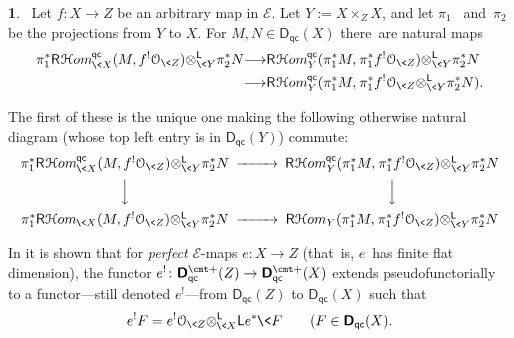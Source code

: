 \documentclass{compositio}
\theoremstyle{plain}
\theoremstyle{definition}
\newtheorem{cosa}[thm]{}
\theoremstyle{remark}
\numberwithin{equation}{thm}
\begin{document}
\begin{cosa}
\
Let $f\colon X\to Z$ be an arbitrary map in ${\mathscr{E}}$. Let $Y{\!:=} X\times_ZX$, and let $\pi_1$~
and~$\pi_2$ be the projections from $Y$ to $X$. 
For  $M, N\in{{\boldsymbol{\mathsf{D}}}_{\mathsf{qc}}}(X)$ there~are natural maps{\vspace{2pt}}
\begin{equation}
\label{setup}
\begin{aligned}
\pi_1^*{{\mathsf R}{\mkern1mu}{{\mathcal H} om}_{{{\mkern-1mu}\<X}}^{{\mkern-1mu}{\mathsf{qc}}}}(M,f^!{\mathcal O_{\<Z}}){\otimes^{\mathsf L}_{{\<Y}}}\pi_2^*N
&{\longrightarrow} {{\mathsf R}{\mkern1mu}{{\mathcal H} om}_{{Y}}^{{\mkern-1mu}{\mathsf{qc}}}}(\pi_1^*M,{\mkern1mu}\pi_1^*f^!{\mathcal O_{\<Z}}){\otimes^{\mathsf L}_{{\<Y}}}\pi_2^*N\\
&{\longrightarrow} {{\mathsf R}{\mkern1mu}{{\mathcal H} om}_{{Y}}^{{\mkern-1mu}{\mathsf{qc}}}}(\pi_1^*M,{\mkern1mu}\pi_1^*f^!{\mathcal O_{\<Z}}{\otimes^{\mathsf L}_{{\<Y}}}\pi_2^*N).
\end{aligned}
\end{equation}

\vskip1pt
\noindent The first of these is the unique one making the following otherwise natural diagram (whose top left entry is in ${{\boldsymbol{\mathsf{D}}}_{\mathsf{qc}}}(Y)$) commute:{\vspace{2pt}}
\begin{equation}\label{setup'}
\CD
\pi_1^*{{\mathsf R}{\mkern1mu}{{\mathcal H} om}_{{{\mkern-1mu}\<X}}^{{\mkern-1mu}{\mathsf{qc}}}}(M,f^!{\mathcal O_{\<Z}}){\otimes^{\mathsf L}_{{\<Y}}}\pi_2^*N
@>>> {{\mathsf R}{\mkern1mu}{{\mathcal H} om}_{{Y}}^{{\mkern-1mu}{\mathsf{qc}}}}(\pi_1^*M,{\mkern1mu}\pi_1^*f^!{\mathcal O_{\<Z}}){\otimes^{\mathsf L}_{{\<Y}}}\pi_2^*N\\
@VVV @VVV\\
\pi_1^*{\mathsf R}{{\mathcal H} om}_{{{\mkern-1mu}\<X}}(M,f^!{\mathcal O_{\<Z}}){\otimes^{\mathsf L}_{{\<Y}}}\pi_2^*N
@>>> {\mathsf R}{{\mathcal H} om}_Y(\pi_1^*M,{\mkern1mu}\pi_1^*f^!{\mathcal O_{\<Z}}){\otimes^{\mathsf L}_{{\<Y}}}\pi_2^*N
\endCD
\end{equation}
\vskip1pt

In \cite[\S5.7{\kern.5pt}]{AJL3} it is shown that for \emph{perfect} ${\mathscr{E}}$-maps  $e\colon X\to Z$ (that~is, $e$~has finite flat dimension),
 the functor{\vspace{{-1}pt}} $e^!\colon{{\boldsymbol{\mathsf{D}}}_{\mathsf{qc}}^{{\vbox to 0pt{\vskip-.95 ex\hbox{$\scriptstyle \text{\cmt\char'053}$}\vss}}}}(Z)\to {{\boldsymbol{\mathsf{D}}}_{\mathsf{qc}}^{{\vbox to 0pt{\vskip-.95 ex\hbox{$\scriptstyle \text{\cmt\char'053}$}\vss}}}}(X)$ extends pseudo\-functorially to a 
functor---still denoted $e^!$---from ${{\boldsymbol{\mathsf{D}}}_{\mathsf{qc}}}(Z)$ to ${{\boldsymbol{\mathsf{D}}}_{\mathsf{qc}}}(X)$ such that {\vspace{1pt}}
\begin{equation}\label{extend!}
e^!F=e^!{\mathcal O_{\<Z}}{\otimes^{\mathsf L}_{{{\mkern-1mu}\<X}}}{\mathsf L} e^*{\mkern-1mu}\<F\qquad (F\in{{\boldsymbol{\mathsf{D}}}_{\mathsf{qc}}}(X).
\end{equation}


\end{cosa}
\end{document}
